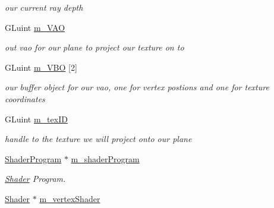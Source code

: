 \begin{DoxyCompactItemize}
\begin{DoxyCompactList}\small\item\em our current ray depth \end{DoxyCompactList}\item 
\hypertarget{class_open_g_l_widget_ad867ae1c626f65e82b440ed164aac553}{G\-Luint \hyperlink{class_open_g_l_widget_ad867ae1c626f65e82b440ed164aac553}{m\-\_\-\-V\-A\-O}}\label{class_open_g_l_widget_ad867ae1c626f65e82b440ed164aac553}

\begin{DoxyCompactList}\small\item\em out vao for our plane to project our texture on to \end{DoxyCompactList}\item 
\hypertarget{class_open_g_l_widget_a72beb5ad7fbbee8c2558469f310241a6}{G\-Luint \hyperlink{class_open_g_l_widget_a72beb5ad7fbbee8c2558469f310241a6}{m\-\_\-\-V\-B\-O} \mbox{[}2\mbox{]}}\label{class_open_g_l_widget_a72beb5ad7fbbee8c2558469f310241a6}

\begin{DoxyCompactList}\small\item\em our buffer object for our vao, one for vertex postions and one for texture coordinates \end{DoxyCompactList}\item 
\hypertarget{class_open_g_l_widget_aa594b3d4f28c30cf499802a6481f392d}{G\-Luint \hyperlink{class_open_g_l_widget_aa594b3d4f28c30cf499802a6481f392d}{m\-\_\-tex\-I\-D}}\label{class_open_g_l_widget_aa594b3d4f28c30cf499802a6481f392d}

\begin{DoxyCompactList}\small\item\em handle to the texture we will project onto our plane \end{DoxyCompactList}\item 
\hypertarget{class_open_g_l_widget_a3498f34999b8970e4792905197ef70f2}{\hyperlink{class_shader_program}{Shader\-Program} $\ast$ \hyperlink{class_open_g_l_widget_a3498f34999b8970e4792905197ef70f2}{m\-\_\-shader\-Program}}\label{class_open_g_l_widget_a3498f34999b8970e4792905197ef70f2}

\begin{DoxyCompactList}\small\item\em \hyperlink{class_shader}{Shader} Program. \end{DoxyCompactList}\item 
\hypertarget{class_open_g_l_widget_abd5e25182664465058818a07c41ba294}{\hyperlink{class_shader}{Shader} $\ast$ \hyperlink{class_open_g_l_widget_abd5e25182664465058818a07c41ba294}{m\-\_\-vertex\-Shader}}\label{class_open_g_l_widget_abd5e25182664465058818a07c41ba294}


\end{DoxyCompactItemize}
